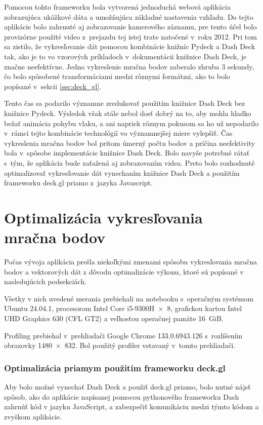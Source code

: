 Pomocou tohto frameworku bola vytvorená jednoduchá webová aplikácia zobrazujúca ukážkové dáta a umožňujúca základné nastavenia vzhľadu. Do tejto aplikácie bolo zahrnuté aj zobrazovanie kamerového záznamu, pre tento účel bolo provizórne použité video z~prejazdu tej istej trate natočené v~roku 2012. Pri tom sa zistilo, že vykresľovanie dát pomocou kombinácie knižníc Pydeck a Dash Deck tak, ako je to vo vzorových príkladoch v~dokumentácii knižnice Dash Deck, je značne neefektívne. Jedno vykreslenie mračna bodov zaberalo zhruba 3 sekundy, čo bolo spôsobené transformáciami medzi rôznymi formátmi, ako to bolo popísané v~sekcii \ref{sec:deck_gl}.

Tento čas sa podarilo významne zredukovať použitím knižnice Dash Deck bez knižnice Pydeck. Výsledok však stále nebol dosť dobrý na to, aby mohla hladko bežať animácia pohybu vlaku, a ani napriek rôznym pokusom sa ho už nepodarilo v~rámci tejto kombinácie technológií vo významnejšej miere vylepšiť. Čas vykreslenia mračna bodov bol pritom úmerný počtu bodov a príčina neefektivity bola v~spôsobe implementácie knižnice Dash Deck. Bolo navyše potrebné rátať s~tým, že aplikácia bude zaťažená aj zobrazovaním videa. Preto bolo rozhodnuté optimalizovať vykresľovanie dát vynechaním knižnice Dash Deck a použitím frameworku deck.gl priamo z~jazyka Javascript.

\section{Optimalizácia vykresľovania mračna bodov}

Počas vývoja aplikácia prešla niekoľkými zmenami spôsobu vykresľovania mračna bodov a vektorových dát z dôvodu optimalizácie výkonu, ktoré sú popísané v nasledujúcich podsekciách.

Všetky v nich uvedené merania prebiehali na notebooku s~operačným systémom Ubuntu 24.04.1, procesorom Intel Core i5-9300H~×~8, grafickou kartou Intel UHD Graphics 630 (CFL GT2) a veľkosťou operačnej pamäte 16~GiB.

Profiling prebiehal v~prehliadači Google Chrome 133.0.6943.126 s~rozlíšením obrazovky 1480~×~832. Bol použitý profiler vstavaný v~tomto prehliadači.

\subsubsection{Optimalizácia priamym použitím frameworku deck.gl}

Aby bolo možné vynechať Dash Deck a použiť deck.gl priamo, bolo nutné nájsť spôsob, ako do aplikácie napísanej pomocou pythonového frameworku Dash zahrnúť kód v jazyku JavaScript, a zabezpečiť komunikáciu medzi týmto kódom a zvyškom aplikácie.

